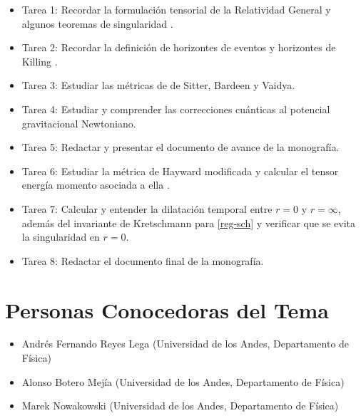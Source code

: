 \documentclass[prb,aps,preprintnumbers,amsmath,amssymb]{article}
\begin{document}
\begin{itemize}
	\item Tarea 1: Recordar la formulación tensorial de la Relatividad General y algunos teoremas de singularidad \cite{inverno}.
	\item Tarea 2: Recordar la definición de horizontes de eventos y horizontes de Killing \cite{hawking}.
	\item Tarea 3: Estudiar las métricas de de Sitter, Bardeen y Vaidya.
	\item Tarea 4: Estudiar y comprender las correcciones cuánticas al potencial gravitacional Newtoniano.
	\item Tarea 5: Redactar y presentar el documento de avance de la monografía.
	\item Tarea 6: Estudiar la métrica de Hayward modificada y calcular el tensor energía momento asociada a ella .
	\item Tarea 7: Calcular y entender la dilatación temporal entre $r = 0$ y $r = \infty$, además del invariante de Kretschmann para \eqref{reg-sch} y verificar que se evita la singularidad en $r = 0$.
	\item Tarea 8: Redactar el documento final de la monografía.
\end{itemize}

\section{Personas Conocedoras del Tema}


\begin{itemize}
	\item Andrés Fernando Reyes Lega (Universidad de los Andes, Departamento de Física)
	\item Alonso Botero Mejía (Universidad de los Andes, Departamento de Física)
	\item Marek Nowakowski (Universidad de los Andes, Departamento de Física)
\end{itemize}
\end{document}

